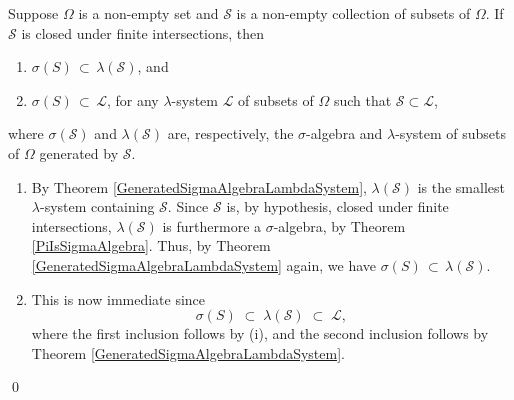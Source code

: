\begin{corollary}\label{SigmaAlgebraContainedInPiSystem}
\quad
Suppose $\Omega$ is a non-empty set and $\mathcal{S}$ is a non-empty collection of subsets of $\Omega$.
\vskip 0.1cm
\noindent
If $\mathcal{S}$ is closed under finite intersections, then
\begin{enumerate}
\item	$\sigma\!\left(S\right)\,\subset\,\lambda\!\left(\mathcal{S}\right)$, and
\item	$\sigma\!\left(S\right)\,\subset\,\mathcal{L}$, \;for any $\lambda$-system $\mathcal{L}$ of subsets of $\Omega$
		such that $\mathcal{S}\subset\mathcal{L}$,
\end{enumerate}
where $\sigma\!\left(\mathcal{S}\right)$ and $\lambda\!\left(\mathcal{S}\right)$
are, respectively, the $\sigma$-algebra and $\lambda$-system of subsets of $\Omega$ generated by $\mathcal{S}$.
\end{corollary}
\proof
\begin{enumerate}
\item
	By Theorem \ref{GeneratedSigmaAlgebraLambdaSystem}, $\lambda(\mathcal{S})$ is the
	smallest $\lambda$-system containing $\mathcal{S}$.
	Since $\mathcal{S}$ is, by hypothesis, closed under finite intersections,
	$\lambda(\mathcal{S})$ is furthermore a $\sigma$-algebra, by Theorem \ref{PiIsSigmaAlgebra}.
	Thus, by Theorem \ref{GeneratedSigmaAlgebraLambdaSystem} again, we have
	$\sigma\!\left(S\right)\,\subset\,\lambda\!\left(\mathcal{S}\right)$.
\item
	This is now immediate since
	\begin{equation*}
	\sigma\!\left(S\right)
	\; \subset \; \lambda\!\left(\mathcal{S}\right)
	\; \subset \; \mathcal{L},
	\end{equation*}
	where the first inclusion follows by (i), and the second inclusion follows by
	Theorem \ref{GeneratedSigmaAlgebraLambdaSystem}.
\end{enumerate}
\qed

